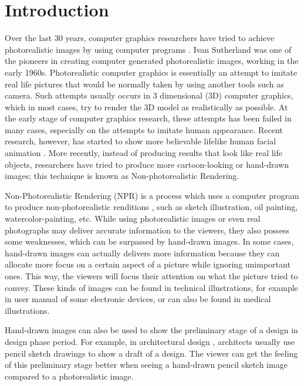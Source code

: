 \section{Introduction}

Over the last 30 years, computer graphics researchers have tried to achieve photorealistic images by using computer programs \cite{strothotte02}. Ivan Sutherland was one of the pioneers in creating computer generated photorealistic images, working in the early 1960s. Photorealistic computer graphics is essentially an attempt to imitate real life pictures that would be normally taken by using another tools such as camera. Such attempts usually occurs in 3 dimensional (3D) computer graphics, which in most cases, try to render the 3D model as realistically as possible. At the early stage of computer graphics research, these attempts has been failed in many cases, especially on the attempts to imitate human appearance. Recent research, however, has started to show more believable lifelike human facial animation \cite{emily08}. More recently, instead of producing results that look like real life objects, researchers have tried to produce more cartoon-looking or hand-drawn images; this technique is known as Non-photorealistic Rendering.

Non-Photorealistic Rendering (NPR) is a process which uses a computer program to produce non-photorealistic renditions \cite{strothotte02}, such as sketch illustration, oil painting, watercolor-painting, etc. While using photorealistic images or even real photographs may deliver accurate information to the viewers, they also possess some weaknesses, which can be surpassed by hand-drawn images. In some cases, hand-drawn images can actually delivers more information because they can allocate more focus on a certain aspect of a picture while ignoring unimportant ones. This way, the viewers will focus their attention on what the picture tried to convey. These kinds of images can be found in technical illustrations, for example in user manual of some electronic devices, or can also be found in medical illustrations.

Hand-drawn images can also be used to show the preliminary stage of a design in design phase period. For example, in architectural design \cite{schumann96},  architects usually use pencil sketch drawings to show a draft of a design. The viewer can get the feeling of this preliminary stage better when seeing a hand-drawn pencil sketch image compared to a photorealistic image.

